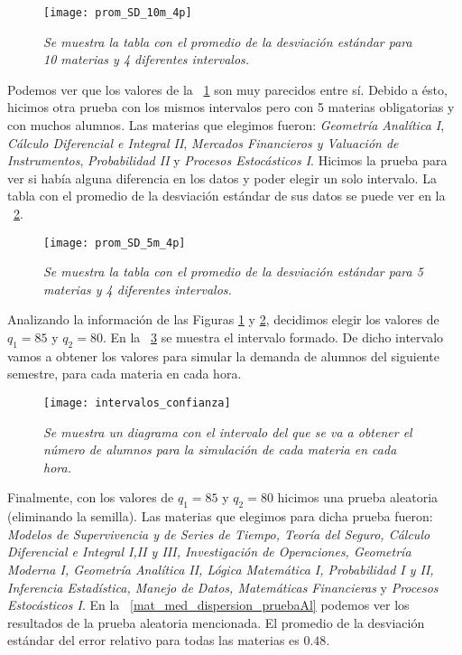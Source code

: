 \begin{figure}[H]
\centering
\texttt{[image: prom\_SD\_10m\_4p]} %
\caption[\textit{Promedio de la desviación estándar: 10 materias, 4 intervalos}]{\textit{Se muestra la tabla con el promedio de la desviación estándar para 10 materias y 4 diferentes intervalos.}}\label{promSD_10m_4p}
\end{figure}

Podemos ver que los valores de la \figurename{~\ref{promSD_10m_4p}} son muy parecidos entre sí. Debido a ésto, hicimos otra prueba con los mismos intervalos pero con 5 materias obligatorias y con muchos alumnos. Las materias que elegimos fueron: \textit{Geometría Analítica I}, \textit{Cálculo Diferencial e Integral II}, \textit{Mercados Financieros y Valuación de Instrumentos}, \textit{Probabilidad II} y \textit{Procesos Estocásticos I}. Hicimos la prueba para ver si había alguna diferencia en los datos y poder elegir un solo intervalo. La tabla con el promedio de la desviación estándar de sus datos se puede ver en la \figurename{~\ref{promSD_5m_4p}}.


\begin{figure}[H]
\centering
\texttt{[image: prom\_SD\_5m\_4p]} %
\caption[\textit{Promedio de la desviación estándar: 5 materias, 4 intervalos}]{\textit{Se muestra la tabla con el promedio de la desviación estándar para 5 materias y 4 diferentes intervalos.}}\label{promSD_5m_4p}
\end{figure}

Analizando la información de las Figuras \ref{promSD_10m_4p} y \ref{promSD_5m_4p}, decidimos elegir los valores de $q_{1} = 85$ y $q_{2} = 80$. En la \figurename{~\ref{interConf}} se muestra el intervalo formado. De dicho intervalo vamos a obtener los valores para simular la demanda de alumnos del siguiente semestre, para cada materia en cada hora.

\begin{figure}[H]
\centering
\texttt{[image: intervalos\_confianza]} %
\caption[\textit{Diagrama de los intervalos de confianza}]{\textit{Se muestra un diagrama con el intervalo del que se va a obtener el número de alumnos para la simulación de cada materia en cada hora.}}\label{interConf}
\end{figure}

Finalmente, con los valores de $q_{1} = 85$ y $q_{2} = 80$ hicimos una prueba aleatoria (eliminando la semilla). Las materias que elegimos para dicha prueba fueron: \textit{Modelos de Supervivencia y de Series de Tiempo, Teoría del Seguro, Cálculo Diferencial e Integral I,II y III, Investigación de Operaciones, Geometría Moderna I, Geometría Analítica II, Lógica Matemática I, Probabilidad I y II, Inferencia Estadística, Manejo de Datos, Matemáticas Financieras} y \textit{Procesos Estocásticos I}. En la \figurename{~\ref{mat_med_dispersion_pruebaAl}} podemos ver los resultados de la prueba aleatoria mencionada. El promedio de la desviación estándar del error relativo para todas las materias es $0.48$.%

